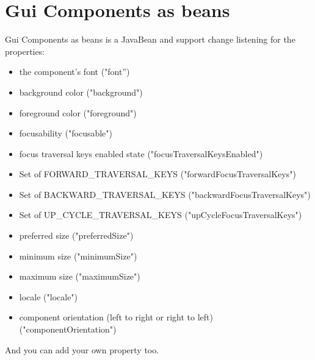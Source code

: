 \section[GUI BEANS]{Gui Components as beans}
\begin{frame}[shrink]{Gui Components as beans}
   is a JavaBean and support change listening
  for the properties:
  \begin{itemize}
  \item the component's font  ("font'')
  \item background color ("background")
  \item foreground color ("foreground")
  \item focusability ("focusable")
  \item focus traversal keys enabled state ("focusTraversalKeysEnabled")
  \item Set of FORWARD\_TRAVERSAL\_KEYS ("forwardFocusTraversalKeys")
  \item Set of BACKWARD\_TRAVERSAL\_KEYS ("backwardFocusTraversalKeys")
  \item Set of UP\_CYCLE\_TRAVERSAL\_KEYS ("upCycleFocusTraversalKeys")
  \item preferred size ("preferredSize")
  \item minimum size ("minimumSize")
  \item maximum size ("maximumSize")
  \item locale ("locale")
  \item component orientation (left to right or right to left)
    ("componentOrientation")
   \end{itemize}
   And you can add your own property too. 

\end{frame}


